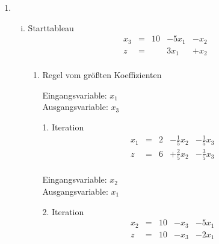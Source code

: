 \documentclass[a4paper]{scrartcl}
\begin{document}
\begin{enumerate}[label=\bfseries\arabic*.]
\begin{enumerate}
\begin{enumerate}[(i)]
                \end{enumerate}

            \item
                \begin{enumerate}[(i)]
                    \item
                        Starttableau
                        \begin{equation}
                            \begin{array}{rcrrr}
                                x_3 & = & 10 & -5x_1 & -x_2 \\
                                \hline
                                z   & = &   & 3x_1 & +x_2 \\
                            \end{array}
                        \end{equation}

                        \begin{enumerate}
                            \item Regel vom größten Koeffizienten

                                Eingangsvariable: $x_1$ \\
                                Ausgangsvariable: $x_3$

                                1. Iteration
                                \begin{equation}
                                    \begin{array}{rcrrr}
                                        x_1 & = & 2 & -\frac{1}{5}x_2 & -\frac{1}{5}x_3 \\
                                        \hline
                                        z   & = & 6 & +\frac{2}{5}x_2 & -\frac{3}{5}x_3 \\
                                    \end{array}
                                \end{equation}

                                Eingangsvariable: $x_2$ \\
                                Ausgangsvariable: $x_1$

                                2. Iteration
                                \begin{equation}
                                    \begin{array}{rcrrr}
                                        x_2 & = & 10 & -x_3 & -5x_1 \\
                                        \hline
                                        z   & = & 10 & -x_3 & -2x_1 \\
                                    \end{array}
                                \end{equation}


\end{enumerate}
\end{enumerate}
\end{enumerate}
\end{enumerate}
\end{document}
